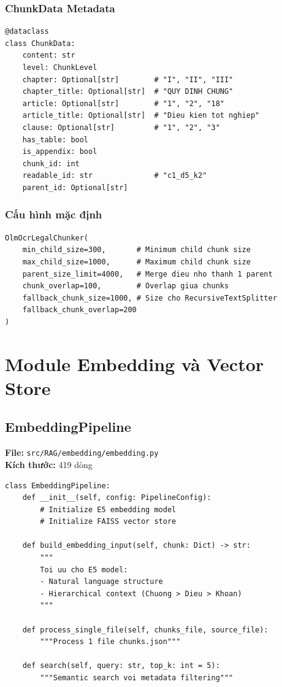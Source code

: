 \documentclass[../DoAn.tex]{subfiles}
\begin{document}
\subsubsection{ChunkData Metadata}
\begin{verbatim}
@dataclass
class ChunkData:
    content: str
    level: ChunkLevel
    chapter: Optional[str]        # "I", "II", "III"
    chapter_title: Optional[str]  # "QUY DINH CHUNG"
    article: Optional[str]        # "1", "2", "18"
    article_title: Optional[str]  # "Dieu kien tot nghiep"
    clause: Optional[str]         # "1", "2", "3"
    has_table: bool
    is_appendix: bool
    chunk_id: int
    readable_id: str              # "c1_d5_k2"
    parent_id: Optional[str]
\end{verbatim}

\subsubsection{Cấu hình mặc định}
\begin{verbatim}
OlmOcrLegalChunker(
    min_child_size=300,       # Minimum child chunk size
    max_child_size=1000,      # Maximum child chunk size
    parent_size_limit=4000,   # Merge dieu nho thanh 1 parent
    chunk_overlap=100,        # Overlap giua chunks
    fallback_chunk_size=1000, # Size cho RecursiveTextSplitter
    fallback_chunk_overlap=200
)
\end{verbatim}

\section{Module Embedding và Vector Store}

\subsection{EmbeddingPipeline}
\textbf{File:} \texttt{src/RAG/embedding/embedding.py}\\
\textbf{Kích thước:} 419 dòng

\begin{verbatim}
class EmbeddingPipeline:
    def __init__(self, config: PipelineConfig):
        # Initialize E5 embedding model
        # Initialize FAISS vector store
    
    def build_embedding_input(self, chunk: Dict) -> str:
        """
        Toi uu cho E5 model:
        - Natural language structure
        - Hierarchical context (Chuong > Dieu > Khoan)
        """
    
    def process_single_file(self, chunks_file, source_file):
        """Process 1 file chunks.json"""
    
    def search(self, query: str, top_k: int = 5):
        """Semantic search voi metadata filtering"""
\end{verbatim}
\end{document}
